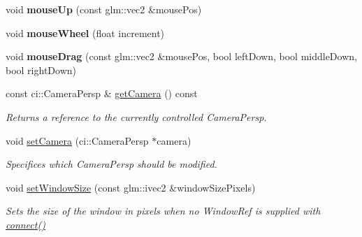 \begin{DoxyCompactItemize}
\mbox{\label{classpepr3d_1_1_camera_ui_a0c998e209f4eb649ab528aaa488df1f5}} 
void {\bfseries mouse\+Up} (const glm\+::vec2 \&mouse\+Pos)
\item 
\mbox{\label{classpepr3d_1_1_camera_ui_a109c9a2f100d0fadd545adddadaecf84}} 
void {\bfseries mouse\+Wheel} (float increment)
\item 
\mbox{\label{classpepr3d_1_1_camera_ui_a0b26b5c24ea20b737994007eb6dbc239}} 
void {\bfseries mouse\+Drag} (const glm\+::vec2 \&mouse\+Pos, bool left\+Down, bool middle\+Down, bool right\+Down)
\item 
\mbox{\label{classpepr3d_1_1_camera_ui_aaae962d04b85948a651219bdafcebae6}} 
const ci\+::\+Camera\+Persp \& \mbox{\hyperlink{classpepr3d_1_1_camera_ui_aaae962d04b85948a651219bdafcebae6}{get\+Camera}} () const
\begin{DoxyCompactList}\small\item\em Returns a reference to the currently controlled Camera\+Persp. \end{DoxyCompactList}\item 
\mbox{\label{classpepr3d_1_1_camera_ui_a2ca4199246c29913492a640f8e0e0a95}} 
void \mbox{\hyperlink{classpepr3d_1_1_camera_ui_a2ca4199246c29913492a640f8e0e0a95}{set\+Camera}} (ci\+::\+Camera\+Persp $\ast$camera)
\begin{DoxyCompactList}\small\item\em Specifices which Camera\+Persp should be modified. \end{DoxyCompactList}\item 
\mbox{\label{classpepr3d_1_1_camera_ui_a2c23f95d7c2ecb2234bdd6edb0450017}} 
void \mbox{\hyperlink{classpepr3d_1_1_camera_ui_a2c23f95d7c2ecb2234bdd6edb0450017}{set\+Window\+Size}} (const glm\+::ivec2 \&window\+Size\+Pixels)
\begin{DoxyCompactList}\small\item\em Sets the size of the window in pixels when no Window\+Ref is supplied with \mbox{\hyperlink{classpepr3d_1_1_camera_ui_a740dadafa1f80d92bf2a902d86f61158}{connect()}} \end{DoxyCompactList}\item 

\end{DoxyCompactItemize}

